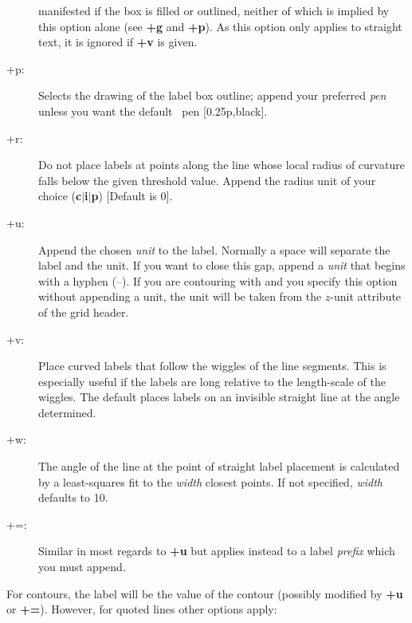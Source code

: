 \begin{description}
manifested if the box is filled or outlined, neither of which is implied by this option alone (see \textbf{+g}
and \textbf{+p}).  As this option only applies to straight text, it is ignored if \textbf{+v} is given.
\item [+p:] Selects the drawing of the label box outline; append your preferred \emph{pen} unless you
want the default \GMT\ pen [0.25p,black].
\item [+r:] Do not place labels at points along the line whose local radius of curvature falls below
the given threshold value.  Append the radius unit of your choice (\textbf{c$|$i$|$p}) [Default is 0].
\item [+u:] Append the chosen \emph{unit} to the label.  Normally a space will separate the label
and the unit.  If you want to close this gap, append a \emph{unit} that begins with a hyphen (--).
If you are contouring with  and you specify this option without appending a unit, the unit will be taken from the
$z$-unit attribute of the grid header.
\item [+v:]  Place curved labels that follow the wiggles of the line segments.  This is especially
useful if the labels are long relative to the length-scale of the wiggles.  The default places labels
on an invisible straight line at the angle determined.
\item [+w:] The angle of the line at the point of straight label placement is calculated by a least-squares
fit to the \emph{width} closest points.  If not specified, \emph{width} defaults to 10.
\item [+=:]  Similar in most regards to \textbf{+u} but applies instead to a label \emph{prefix} which
you must append.
\end{description}
For contours, the label will be the value of the contour (possibly modified by \textbf{+u} or \textbf{+=}).
However, for quoted lines other options apply:
